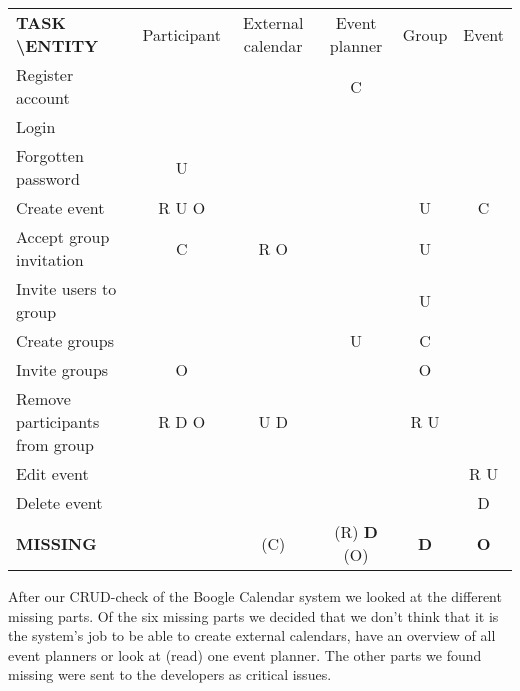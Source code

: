 \documentclass[a4paper]{article}
\begin{document}
	\begin{center}
		
		
			\begin{tabular}{|l||c|c|c|c|c|}
			\hline 
			\textbf{TASK \textbackslash ENTITY} & Participant & External calendar & Event planner & Group & Event \\ 
			\hhline{|=||=|=|=|=|=|}
			Register account & & & C & & \\ 
			\hline 
			Login & & & & & \\ 
			\hline 
			Forgotten password & U & & & & \\ 
			\hline 
			Create event & R U O & & & U & C \\ 
			\hline 
			Accept group invitation & C & R O & & U & \\ 
			\hline 
			Invite users to group & & & & U & \\ 
			\hline 
			Create groups & & & U & C & \\ 
			\hline 
			Invite groups & O & & & O & \\ 
			\hline 
			Remove participants from group & R D O & U D & & R U & \\ 
			\hline 
			Edit event & & & & & R U \\ 
			\hline 
			Delete event & & & & & D \\ 
			\hhline{|=||=|=|=|=|=|}
			\textbf{MISSING} & & (C) & (R) \textbf{D} (O) & \textbf{D} & \textbf{O} \\ 
			\hline 
			\end{tabular} 
	
		\end{center}
			After our CRUD-check of the Boogle Calendar system we looked at the different missing parts. Of the six missing parts we decided that we don't think that it is the system's job to be able to create external calendars, have an overview of all event planners or look at (read) one event planner. The other parts we found missing were sent to the developers as critical issues.

			
\end{document}
